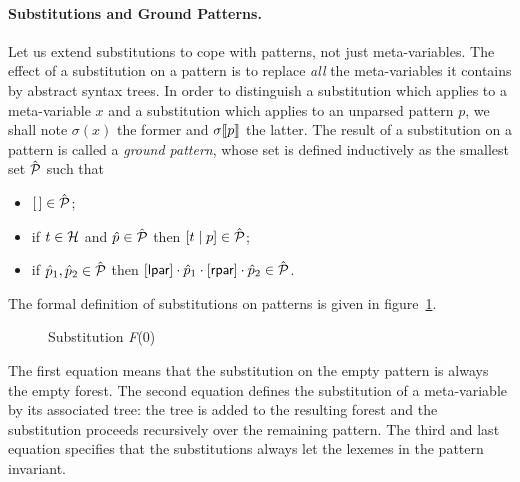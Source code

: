 \paragraph{Substitutions and Ground Patterns.}

Let us extend substitutions to cope with patterns, not just
meta\hyp{}variables. The effect of a substitution on a pattern is to
replace \emph{all} the meta\hyp{}variables it contains by abstract
syntax trees. In order to distinguish a substitution which applies to
a meta\hyp{}variable \(x\) and a substitution which applies to an
unparsed pattern \(p\), we shall note \(\sigma(x)\) the
former and \({\sigma}\llbracket{p}\rrbracket\) the latter. The result of
a substitution on a pattern is called a \emph{ground pattern}, whose
set is defined inductively as the smallest set \(\hat{\cal P}\) such
that
\begin{itemize}

  \item \([\,] \in \hat{\cal P}\);

  \item if \(t \in {\cal H}\) and \(\hat{p} \in \hat{\cal P}\) then
    \([{t}\mid{p}] \in \hat{\cal P}\);

  \item if \(\hat{p}_1, \hat{p}_2 \in \hat{\cal P}\) then
    \([\textsf{lpar}] \cdot \hat{p}_1 \cdot [\textsf{rpar}] \cdot \hat{p}_2 \in
    \hat{\cal P}\).

\end{itemize}
The formal definition of substitutions on patterns is given in
figure~\ref{f0_subst_def}.
\begin{figure}
\caption{Substitution \textit{F}(0)\label{f0_subst_def}}
\end{figure}
The first equation means that the substitution on the empty pattern is
always the empty forest. The second equation defines the substitution
of a meta\hyp{}variable by its associated tree: the tree is added to
the resulting forest and the substitution proceeds recursively over
the remaining pattern. The third and last equation specifies that the
substitutions always let the lexemes in the pattern invariant.

